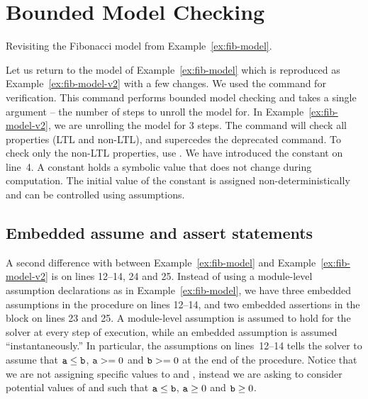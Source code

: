 \section{Bounded Model Checking}

\begin{uclidlisting}[htbp]
    
    \caption{Revisiting the Fibonacci model from Example~\ref{ex:fib-model}.}
    \label{ex:fib-model-v2}
\end{uclidlisting}

Let us return to the model of Example~\ref{ex:fib-model} which is reproduced as Example~\ref{ex:fib-model-v2} with a few changes. We used the  command for verification. This command performs bounded model checking and takes a single argument -- the number of steps to unroll the model for. In Example~\ref{ex:fib-model-v2}, we are unrolling the model for 3 steps. The  command will check all properties (LTL and non-LTL), and supercedes the deprecated  command. To check only the non-LTL properties, use . We have introduced the constant  on line~4. A constant holds a symbolic value that does not change during computation. The initial value of the constant is assigned non-deterministically and can be controlled using assumptions.

\subsection{Embedded assume and assert statements}

A second difference with between Example~\ref{ex:fib-model} and Example~\ref{ex:fib-model-v2} is on lines 12--14, 24 and 25.  Instead of using a module-level assumption declarations as in Example~\ref{ex:fib-model}, we have three embedded assumptions in the  procedure on lines 12--14, and two embedded assertions in the  block on lines 23 and 25. A module-level assumption is assumed to hold for the solver at every step of execution, while an embedded assumption is assumed ``instantaneously.'' In particular, the assumptions on lines~12--14 tells the solver to assume that $\texttt{a} \leq \texttt{b}$, $\texttt{a} >= 0$ and $\texttt{b} >= 0$ at the end of the  procedure. Notice that we are not assigning specific values to  and , instead we are asking \uclid{} to consider potential values of  and  such that $\texttt{a} \leq \texttt{b}$, $\texttt{a} \geq 0$ and $\texttt{b} \geq 0$.

